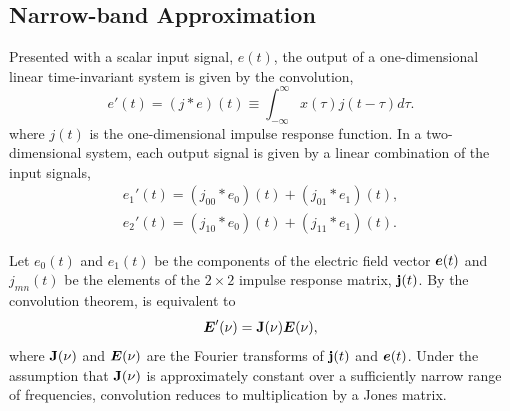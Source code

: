 

\subsection{Narrow-band Approximation}
\label{app:narrow_band_approximation}

Presented with a scalar input signal, $e(t)$, the output of a one-dimensional linear time-invariant system is given by the convolution,
%
\begin{equation}
e'(t)=(j*e)(t) \equiv \int_{-\infty}^{\infty}{x(\tau)j(t-\tau)d\tau}.
\label{eqn:convolution}
\end{equation}
%
where $j(t)$ is the one-dimensional impulse response function.  In a two-dimensional
system, each output signal is given by a linear combination of the input
signals,
\begin{equation}
\begin{split}
e_1'(t)=(j_{00}*e_0)(t) + (j_{01}*e_1)(t), \\
e_2'(t)=(j_{10}*e_0)(t) + (j_{11}*e_1)(t).
\end{split}
\label{eqn:convolution2}
\end{equation}

Let $e_0(t)$ and $e_1(t)$ be the components of the electric field vector $\mbox{\boldmath $e$}(t)$ and $j_{mn}(t)$ be the elements of the $2\times2$ impulse response matrix, ${\bf j}(t)$.
%
By the convolution theorem,  is equivalent to
\begin{equation}
\mbox{\boldmath $E$}'(\nu)={\bf J}(\nu)\mbox{\boldmath $E$}(\nu),
\label{eqn:convolution_nu}
\end{equation}
where ${\bf J}(\nu)$ and $\mbox{\boldmath $E$}(\nu)$ are the Fourier transforms of ${\bf j}(t)$ and $\mbox{\boldmath $e$}(t)$. Under the assumption that ${\bf J}(\nu)$ is
approximately constant over a sufficiently narrow range of frequencies, convolution reduces to multiplication by a Jones matrix. 
